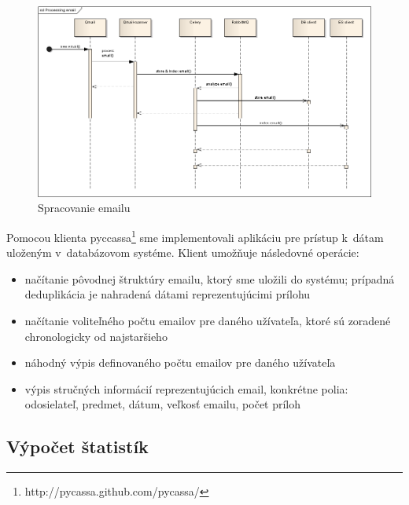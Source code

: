 \documentclass[11pt,twoside,a4paper]{book}
\begin{document}
\begin{figure}[h]
 \centering
 \includegraphics[width=15cm]{./figures/emailProcessing.png}
 \caption{Spracovanie emailu}
 \label{fig:Cseq}
\end{figure}

Pomocou klienta pyccassa\footnote{http://pycassa.github.com/pycassa/} sme implementovali aplikáciu pre prístup k~dátam uloženým v~databázovom systéme. Klient umožňuje následovné operácie:
\begin{itemize}
 \item načítanie pôvodnej štruktúry emailu, ktorý sme uložili do systému; prípadná deduplikácia je nahradená dátami reprezentujúcimi prílohu
 \item načítanie voliteľného počtu emailov pre daného užívateľa, ktoré sú zoradené chronologicky od najstaršieho
 \item náhodný výpis definovaného počtu emailov pre daného užívateľa
 \item výpis stručných informácií reprezentujúcich email, konkrétne polia: odosielateľ, predmet, dátum, veľkosť emailu, počet príloh
\end{itemize}



\subsection{Výpočet štatistík}
\end{document}
